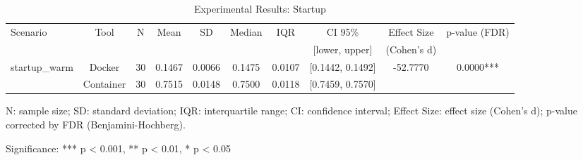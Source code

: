 \documentclass{article}
\begin{document}

\begin{table}[h]
\centering
\small
\caption{Experimental Results: Startup}
\label{tab:startup}
\begin{tabular}{lccccccccc}
\toprule
Scenario & Tool & N & Mean & SD & Median & IQR & CI 95\% & Effect Size & p-value (FDR) \\
 & & & & & & & [lower, upper] & (Cohen's d) & \\
\midrule
\multirow{2}{*}{startup\_warm} & Docker & 30 & 0.1467 & 0.0066 & 0.1475 & 0.0107 & [0.1442, 0.1492] & -52.7770 & 0.0000*** \\
 & Container & 30 & 0.7515 & 0.0148 & 0.7500 & 0.0118 & [0.7459, 0.7570] &  &  \\
\midrule
\bottomrule
\end{tabular}
\begin{tablenotes}
\small
\item N: sample size; SD: standard deviation; IQR: interquartile range; CI: confidence interval; Effect Size: effect size (Cohen's d); p-value corrected by FDR (Benjamini-Hochberg).
\item Significance: *** p < 0.001, ** p < 0.01, * p < 0.05
\end{tablenotes}
\end{table}
\end{document}
